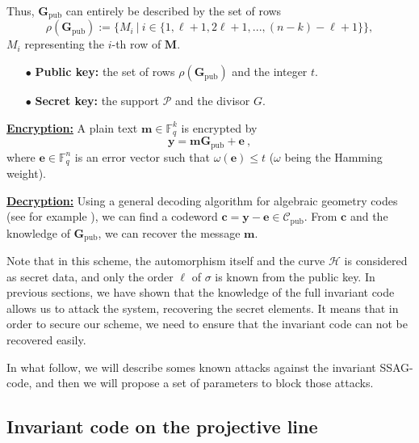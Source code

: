 \documentclass[10pt]{article}
\theoremstyle{definition}
\theoremstyle{definition}
\theoremstyle{definition}
\newcommand{\s}{\vspace{0.3cm}}
\newcommand{\fq}{\mathbb{F}_q}
\newcommand{\w}{\omega}
\newcommand{\PR}{\mathcal{P}}
\begin{document}
\color{black}
Thus, $\mathbf{G}_{\mathrm{pub}}$ can entirely be described by the set of rows
\[\rho(\mathbf{G}_{\mathrm{pub}}) := \{M_i \ | \ i \in \{1,\ell+1,2\ell+1,...,(n-k)-\ell+1\}\},\]
$M_i$ representing the $i$-th row of $\mathbf{M}$. 

\begin{enumerate}
\item[$\bullet$] \textbf{Public key:} the set of rows $\rho(\mathbf{G}_{\mathrm{pub}})$ and the integer $t$.
\item[$\bullet$] \textbf{Secret key:} the support $\PR$ and the divisor $G$.
\end{enumerate}

\s

\underline{\textbf{Encryption:}} A plain text $\mathbf{m} \in \fq^k$ is encrypted by 
\[ \mathbf{y}  = \mathbf{m}\mathbf{G}_{\mathrm{pub}} + \mathbf{e} \ ,\]
where $\mathbf{e} \in \fq^n$ is an error vector such that $\w(\mathbf{e}) \leq t$ ($\w$ being the Hamming weight).

\s

\underline{\textbf{Decryption:}} Using a general decoding algorithm for algebraic geometry codes (see for example \cite{THRP}), we can find a codeword $\mathbf{c} = \mathbf{y} - \mathbf{e} \in \mathcal{C}_{\mathrm{pub}}$. From $\mathbf{c}$ and the knowledge of $\mathbf{G}_{\mathrm{pub}}$, we can recover the message $\mathbf{m}$.

\s

Note that in this scheme, the automorphism itself and the curve $\mathcal{H}$ is considered as secret data, and only the order $\ell$ of $\sigma$ is known from the public key. In previous sections, we have shown that the knowledge of the full invariant code allows us to attack the system, recovering the secret elements. It means that in order to secure our scheme, we need to ensure that the invariant code can not be recovered easily. 

\s

In what follow, we will describe somes known attacks against the invariant SSAG-code, and then we will propose a set of parameters to block those attacks.

\s

\subsection{Invariant code on the projective line} \label{section6.2}

\s
\end{document}
